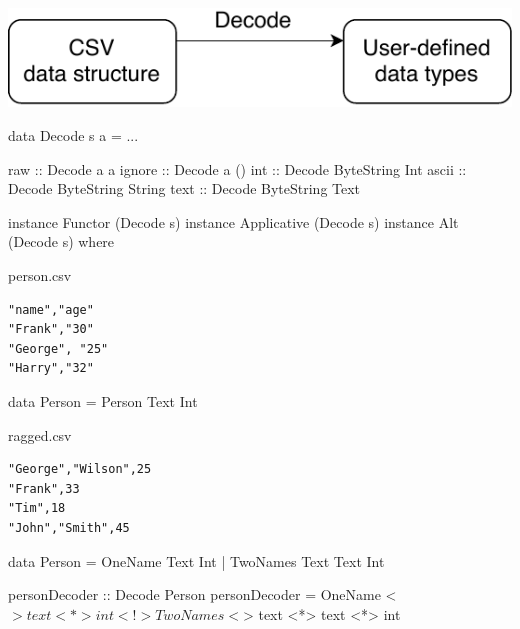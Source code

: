 \documentclass[UKenglish,usenames,dvipsnames,svgnames,table,aspectratio=169,mathserif]{beamer}
\newcommand{\nl}{\vspace{\baselineskip}}
\newcommand{\pnl}{\pause \nl}
\begin{document}
\begin{frame}
\centering
\includegraphics{decode.pdf}
\end{frame}


\begin{frame}[fragile]


\begin{haskellcode}
data Decode s a = ...
\end{haskellcode}
\pnl
\begin{haskellcode}
raw    :: Decode a a
ignore :: Decode a ()
int    :: Decode ByteString Int
ascii  :: Decode ByteString String
text   :: Decode ByteString Text
\end{haskellcode}
\pnl
\begin{haskellcode}
instance Functor (Decode s)
instance Applicative (Decode s)
instance Alt (Decode s) where
\end{haskellcode}
\end{frame}


\begin{frame}[fragile]

\begin{block}{person.csv}
\begin{Verbatim}
"name","age"
"Frank","30"
"George", "25"
"Harry","32"
\end{Verbatim}
\end{block}

\pnl
\begin{haskellcode}
data Person = Person Text Int
\end{haskellcode}

\pnl

\end{frame}


\begin{frame}[fragile]

\begin{block}{ragged.csv}
\begin{Verbatim}
"George","Wilson",25
"Frank",33
"Tim",18
"John","Smith",45
\end{Verbatim}
\end{block}

\pnl
\begin{haskellcode}
data Person
  = OneName Text Int
  | TwoNames Text Text Int
\end{haskellcode}

\pnl
\begin{haskellcode}
personDecoder :: Decode Person
personDecoder =
      OneName <$> text <*> int
  <!> TwoNames <$> text <*> text <*> int
\end{haskellcode}
\end{frame}
\end{document}
